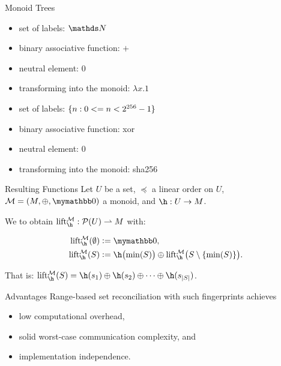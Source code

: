 \documentclass{beamer}
\begin{document}
\begin{frame}{Monoid Trees}
    \begin{itemize}
        \item set of labels: $\N$
        \item binary associative function: $+$
        \item neutral element: $0$\pause\pause
        \item transforming into the monoid: $\lambda x.1$
    \end{itemize}
    \vfill
    \begin{itemize}
        \item<4-> set of labels: $\{n : 0 <= n < 2^{256} - 1\}$
        \item<5-> binary associative function: xor
        \item<5-> neutral element: $0$
        \item<4-> transforming into the monoid: sha256
    \end{itemize}
\end{frame}

\begin{frame}{Resulting Functions}
    Let $U$ be a set, $\preceq$ a linear order on $U$, $\mathcal{M} = (M, \groupaddsym, \neutraladd)$ a monoid, and $\fun{\h}{U}{M}$.

    We  to obtain $\partialfun{\lift{\h}{\mathcal{M}}}{\powerset{U}}{M}$ with:

    \begin{align*}
    \lift{\h}{\mathcal{M}}(\emptyset) &\defeq \neutraladd,\\
    \lift{\h}{\mathcal{M}}(S) &\defeq \h\bigl(\min(S)\bigr) \oplus \lift{\h}{\mathcal{M}}\bigl(S \setminus \set{\min(S)}\bigr).\\
    \end{align*}

    That is: $\lift{\h}{\mathcal{M}}(S) = \groupadd{\h(s_1)}{\groupadd{\h(s_2)}{\groupadd{\cdots}{\h(s_{\abs{S}})}}}$.
\end{frame}

\begin{frame}{Advantages}
    Range-based set reconciliation with such fingerprints achieves
    \begin{itemize}
        \item low computational overhead,
        \item solid worst-case communication complexity, and
        \item implementation independence.
    \end{itemize}
\end{frame}
\end{document}

